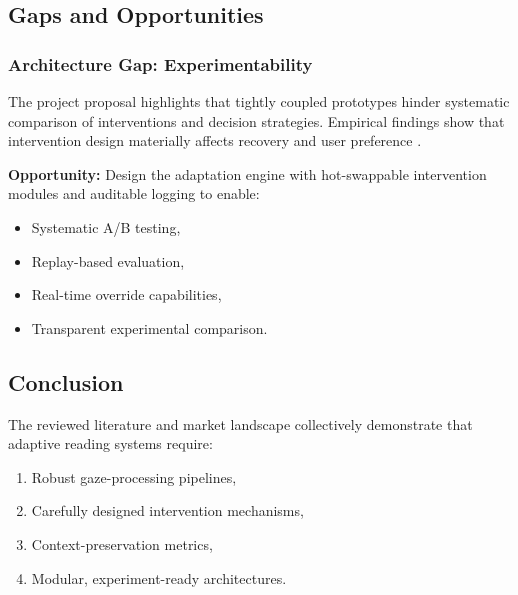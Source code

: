 \subsection{Gaps and Opportunities}

\subsubsection{Architecture Gap: Experimentability}
The project proposal highlights that tightly coupled prototypes hinder systematic comparison of interventions and decision strategies. Empirical findings show that intervention design materially affects recovery and user preference \cite{ref2, ref16}.  

\textbf{Opportunity:} Design the adaptation engine with hot-swappable intervention modules and auditable logging to enable:
\begin{itemize}
    \item Systematic A/B testing,
    \item Replay-based evaluation,
    \item Real-time override capabilities,
    \item Transparent experimental comparison.
\end{itemize}

\subsection{Conclusion}
The reviewed literature and market landscape collectively demonstrate that adaptive reading systems require:
\begin{enumerate}
    \item Robust gaze-processing pipelines,
    \item Carefully designed intervention mechanisms,
    \item Context-preservation metrics,
    \item Modular, experiment-ready architectures.
\end{enumerate}
